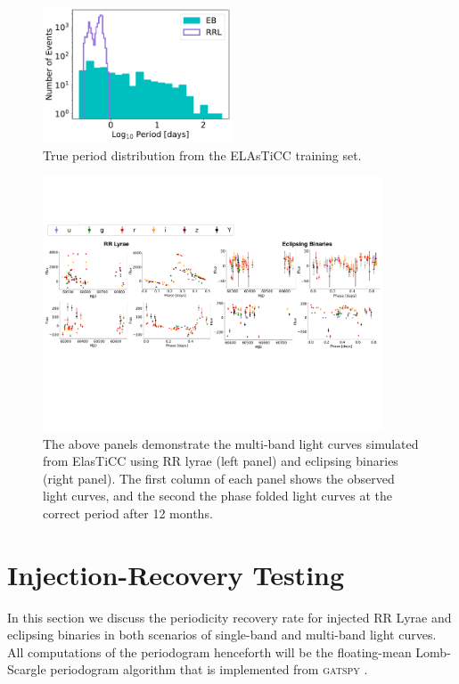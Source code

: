 \documentclass[DM,authoryear,toc]{lsstdoc}
\begin{document}
\begin{figure}
  \includegraphics[width=0.5\textwidth]{figures/period_distribution.pdf}
  \centering 
  \caption{True period distribution from the ELAsTiCC training set.}
   \label{fig:period_distributions}
\end{figure}

\begin{figure}
  \includegraphics[width=0.9\textwidth]{figures/lightcurve_demo.pdf}
  \centering 
  \caption{The above panels demonstrate the multi-band light curves simulated from ElasTiCC using RR lyrae (left panel) and eclipsing binaries (right panel). The first column of each panel shows the observed light curves, and the second the phase folded light curves at the correct period after 12 months.}
   \label{fig:light_curve_demo}
\end{figure}

\section{Injection-Recovery Testing}
In this section we discuss the periodicity recovery rate for injected RR Lyrae and eclipsing binaries in both scenarios of single-band and multi-band light curves. All computations of the periodogram henceforth will be the floating-mean Lomb-Scargle periodogram algorithm that is implemented from \textsc{gatspy} \citet{VanderPlas:VP2015}. 
\end{document}
